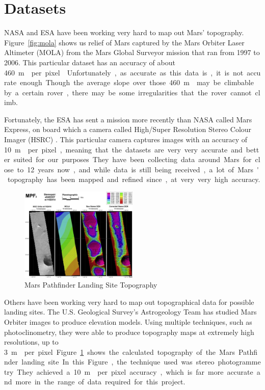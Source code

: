 \documentclass[12pt, twocolumn]{article}
\begin{document}
\section{Datasets}
\label{sec:datasets}
\par NASA and ESA have been working very hard to map out Mars' topography. Figure~\ref{fig:mola} shows us relief of Mars captured by the Mars Orbiter Laser Altimeter (MOLA) from the Mars Global Surveyor mission \cite{bib:mola}that ran from 1997 to 2006. This particular dataset has an accuracy of about \SI{460}\m{} per pixel \cite{bib:nasa-review}. Unfortunately, as accurate as this data is, it is not accurate enough. Though the average slope over those \SI{460}\m{} may be climbable by a certain rover, there may be some irregularities that the rover cannot climb.
\par Fortunately, the ESA has sent a mission more recently than NASA called Mars Express, on board which a camera called High/Super Resolution Stereo Colour Imager (HSRC) \cite{bib:hsrc}. This particular camera captures images with an accuracy of \SI{10}\m{} per pixel, meaning that the datasets are very very accurate and better suited for our purposes. They have been collecting data around Mars for close to 12 years now, and while data is still being received, a lot of Mars' topography has been mapped and refined since, at very very high accuracy.
\begin{figure}[h!]
  \center
  \includegraphics[width=0.5\textwidth]{figures/pathfinder.png}
  \caption{Mars Pathfinder Landing Site Topography}
  \label{fig:pathfinder}
\end{figure}
\par Others have been working very hard to map out topographical data for possible landing sites. The U.S. Geological Survey's Astrogeology Team \cite{bib:landingsites} has studied Mars Orbiter images to produce elevation models. Using multiple techniques, such as photoclinometry, they were able to produce topography maps at extremely high resolutions, up to \SI{3}\m{} per pixel. Figure~\ref{fig:pathfinder} shows the calculated topography of the Mars Pathfinder landing site. In this Figure, the technique used was stereo photogrammetry. They achieved a \SI{10}\m{} per pixel accuracy, which is far more accurate and more in the range of data required for this project.
\end{document}
